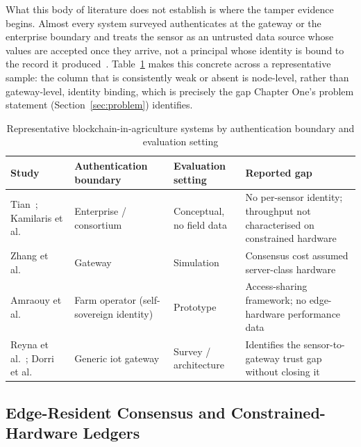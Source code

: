 \documentclass[12pt,a4paper,oneside]{book}
\begin{document}
What this body of literature does not establish is where the tamper
evidence begins. Almost every system surveyed authenticates at the gateway
or the enterprise boundary and treats the sensor as an untrusted data
source whose values are accepted once they arrive, not a principal whose
identity is bound to the record it produced~\cite{lin2020blockchain,
ferrag2020blockchain, xu2019survey, george2025review,
pereira2023blockchainTrust}. Table~\ref{tab:lit-blockchain-ag} makes this
concrete across a representative sample: the column that is consistently
weak or absent is node-level, rather than gateway-level, identity binding,
which is precisely the gap Chapter One's problem statement
(Section~\ref{sec:problem}) identifies.

\begin{table}[htbp]
\centering
\caption{Representative blockchain-in-agriculture systems by authentication
         boundary and evaluation setting}
\label{tab:lit-blockchain-ag}
\footnotesize
\begin{tabularx}{\textwidth}{@{}p{}p{}p{}X@{}}
\toprule
\textbf{Study} & \textbf{Authentication boundary} & \textbf{Evaluation setting} & \textbf{Reported gap} \\
\midrule
Tian~\cite{tian2016agri}; Kamilaris et al.~\cite{kamilaris2019rise}
  & Enterprise / consortium & Conceptual, no field data
  & No per-sensor identity; throughput not characterised on constrained hardware \\
\midrule
Zhang et al.~\cite{zhang2019blockchain}
  & Gateway & Simulation
  & Consensus cost assumed server-class hardware \\
\midrule
Amraouy et al.~\cite{amraouy2025ssi}
  & Farm operator (self-sovereign identity)
  & Prototype
  & Access-sharing framework; no edge-hardware performance data \\
\midrule
Reyna et al.~\cite{reyna2018blockchain}; Dorri et al.~\cite{dorri2017blockchain}
  & Generic \gls{iot} gateway & Survey / architecture
  & Identifies the sensor-to-gateway trust gap without closing it \\
\bottomrule
\end{tabularx}
\end{table}

\subsection{Edge-Resident Consensus and Constrained-Hardware Ledgers}
\label{subsec:lit_consensus}
\end{document}
